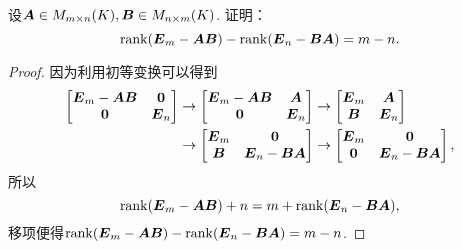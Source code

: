 \begin{example}\label{example:单位矩阵与两矩阵乘积之差.单位矩阵与两矩阵乘积之差的秩}
设\(\boldsymbol{A} \in M_{m \times n}(K),
\boldsymbol{B} \in M_{n \times m}(K)\).
证明：\begin{equation*}
	\rank(\boldsymbol{E}_m-\boldsymbol{A}\boldsymbol{B})-\rank(\boldsymbol{E}_n-\boldsymbol{B}\boldsymbol{A})=m-n.
\end{equation*}
\begin{proof}
因为利用初等变换可以得到\begin{align*}
	\begin{bmatrix}
		\boldsymbol{E}_m-\boldsymbol{A}\boldsymbol{B} & \boldsymbol0 \\
		\boldsymbol0 & \boldsymbol{E}_n
	\end{bmatrix}
	&\to \begin{bmatrix}
		\boldsymbol{E}_m-\boldsymbol{A}\boldsymbol{B} & \boldsymbol{A} \\
		\boldsymbol0 & \boldsymbol{E}_n
	\end{bmatrix}
	\to \begin{bmatrix}
		\boldsymbol{E}_m & \boldsymbol{A} \\
		\boldsymbol{B} & \boldsymbol{E}_n
	\end{bmatrix} \\
	&\to \begin{bmatrix}
		\boldsymbol{E}_m & \boldsymbol0 \\
		\boldsymbol{B} & \boldsymbol{E}_n-\boldsymbol{B}\boldsymbol{A}
	\end{bmatrix}
	\to \begin{bmatrix}
		\boldsymbol{E}_m & \boldsymbol0 \\
		\boldsymbol0 & \boldsymbol{E}_n-\boldsymbol{B}\boldsymbol{A}
	\end{bmatrix},
\end{align*}
所以\begin{equation*}
	\rank(\boldsymbol{E}_m-\boldsymbol{A}\boldsymbol{B})+n=m+\rank(\boldsymbol{E}_n-\boldsymbol{B}\boldsymbol{A}),
\end{equation*}
移项便得\(\rank(\boldsymbol{E}_m-\boldsymbol{A}\boldsymbol{B})-\rank(\boldsymbol{E}_n-\boldsymbol{B}\boldsymbol{A})=m-n\).
\end{proof}
\end{example}

